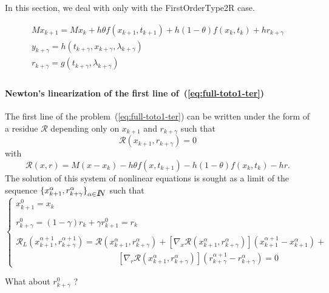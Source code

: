 
In this section, we deal with only with the FirstOrderType2R case.


  \begin{equation}
    \begin{array}{l}
      \label{eq:full-toto1-ter}
      M x_{k+1} = M x_{k} +h \theta f(x_{k+1},t_{k+1}) +h(1-\theta)f(x_{k},t_{k}) + h r_{k+\gamma} \\[2mm]
      y_{k+\gamma} =  h(t_{k+\gamma},x_{k+\gamma},\lambda _{k+\gamma}) \\[2mm]
      r_{k+\gamma} = g(t_{k+\gamma},\lambda_{k+\gamma})\\[2mm]
    \end{array}
\end{equation}

 \paragraph{Newton's linearization of the first line of~(\ref{eq:full-toto1-ter})} The first line of the  problem~(\ref{eq:full-toto1-ter}) can be written under the form of a residue $\mathcal R$ depending only on $x_{k+1}$ and $r_{k+\gamma}$ such that 
\begin{equation}
  \label{eq:full-NL3}
  \mathcal R (x_{k+1},r _{k+\gamma}) =0
\end{equation}
with $$\mathcal R(x,r) = M(x - x_{k}) -h\theta f( x , t_{k+1}) - h(1-\theta)f(x_k,t_k) - h r. $$
The solution of this system of nonlinear equations is sought as a limit of the sequence $\{ x^{\alpha}_{k+1},r^{\alpha}_{k+\gamma} \}_{\alpha \in \mbox{\rm $I\!\!N$}}$ such that
 \begin{equation}
   \label{eq:full-NL7}
   \begin{cases}
     x^{0}_{k+1} = x_k \\ \\
     r^{0}_{k+\gamma} = (1-\gamma ) r_{k} + \gamma r^0_{k+1}  = r_k \\ \\     
     \mathcal R_L( x^{\alpha+1}_{k+1},r^{\alpha+1}_{k+\gamma}) = \mathcal
     R(x^{\alpha}_{k+1},r^{\alpha}_{k+\gamma})  + \left[ \nabla_{x} \mathcal
     R(x^{\alpha}_{k+1},r^{\alpha}_{k+\gamma})\right] (x^{\alpha+1}_{k+1}-x^{\alpha}_{k+1} ) + \\[2mm]
     \qquad\qquad\qquad\qquad\qquad\qquad\left[ \nabla_{r} \mathcal R(x^{\alpha}_{k+1},r^{\alpha}_{k+\gamma})\right] (r^{\alpha+1}_{k+\gamma} - r^{\alpha}_{k+\gamma} ) =0
 \end{cases}
\end{equation}
\begin{ndrva}
  What about $r^0_{k+\gamma}$ ?
\end{ndrva}

